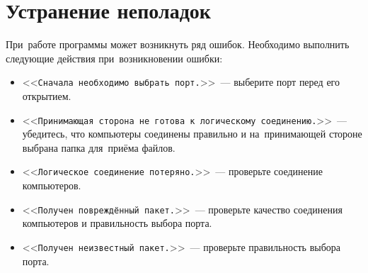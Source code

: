 \documentclass[a4paper,12pt]{article}
\begin{document}
\section{Устранение неполадок}
При~работе программы может возникнуть ряд ошибок. Необходимо выполнить следующие действия при~возникновении ошибки:
\begin{itemize}
\item <<\texttt{Сначала необходимо выбрать порт.}>>~--- выберите порт перед его открытием.
\item <<\texttt{Принимающая сторона не~готова к~логическому соединению.}>>~--- убедитесь, что компьютеры соединены правильно и на~принимающей стороне выбрана папка для~приёма файлов.
\item <<\texttt{Логическое соединение потеряно.}>>~--- проверьте соединение компьютеров.
\item <<\texttt{Получен повреждённый пакет.}>>~--- проверьте качество соединения компьютеров и правильность выбора порта.
\item <<\texttt{Получен неизвестный пакет.}>>~--- проверьте правильность выбора порта.
\end{itemize}
\end{document}
